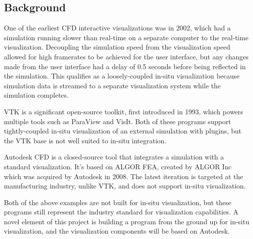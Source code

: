 \subsection{Background}




One of the earliest CFD interactive visualizations was in 2002, which had a simulation running slower than real-time on a separate computer to the real-time visualization\cite{paper:2002vis:10.5555/509740.509745}.
Decoupling the simulation speed from the visualization speed allowed for high framerates to be achieved for the user interface, but any changes made from the user interface had a delay of 0.5 seconds before being reflected in the simulation.
This qualifies as a loosely-coupled in-situ visualization because simulation data is streamed to a separate visualization system while the simulation completes.

VTK is a significant open-source toolkit, first introduced in 1993\cite{VTKBook}, which powers multiple tools such as ParaView and VisIt.
Both of these programs support tightly-coupled in-situ visualization of an external simulation with plugins, but the VTK base is not well suited to in-situ integration\cite{kress2017situ}.

Autodesk CFD is a closed-source tool that integrates a simulation with a standard visualization.
It's based on ALGOR FEA, created by ALGOR Inc which was acquired by Autodesk in 2008\cite{AutodeskAcquiresALGOR}.
The latest iteration is targeted at the manufacturing industry, unlike VTK, and does not support in-situ visualization.

Both of the above examples are not built for in-situ visualization, but these programs still represent the industry standard for visualization capabilities.
A novel element of this project is building a program from the ground up for in-situ visualization, and the visualization components will be based on Autodesk.